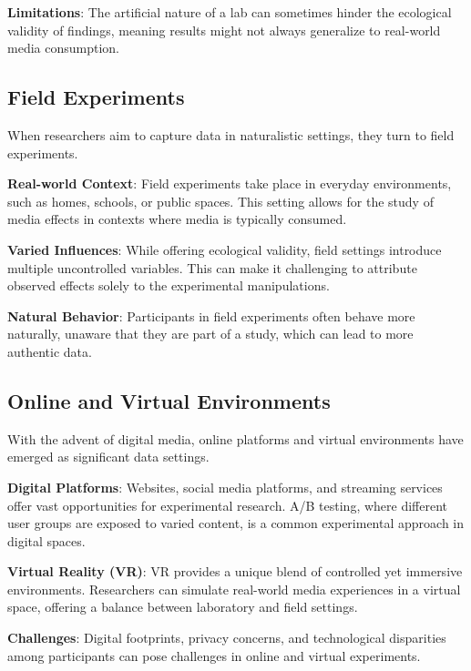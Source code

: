 \documentclass[
  b5paper]{book}
\begin{document}
\textbf{Limitations}: The artificial nature of a lab can sometimes hinder the ecological validity of findings, meaning results might not always generalize to real-world media consumption.

\hypertarget{field-experiments}{%
\subsection*{Field Experiments}\label{field-experiments}}

When researchers aim to capture data in naturalistic settings, they turn to field experiments.

\textbf{Real-world Context}: Field experiments take place in everyday environments, such as homes, schools, or public spaces. This setting allows for the study of media effects in contexts where media is typically consumed.

\textbf{Varied Influences}: While offering ecological validity, field settings introduce multiple uncontrolled variables. This can make it challenging to attribute observed effects solely to the experimental manipulations.

\textbf{Natural Behavior}: Participants in field experiments often behave more naturally, unaware that they are part of a study, which can lead to more authentic data.

\hypertarget{online-and-virtual-environments}{%
\subsection*{Online and Virtual Environments}\label{online-and-virtual-environments}}

With the advent of digital media, online platforms and virtual environments have emerged as significant data settings.

\textbf{Digital Platforms}: Websites, social media platforms, and streaming services offer vast opportunities for experimental research. A/B testing, where different user groups are exposed to varied content, is a common experimental approach in digital spaces.

\textbf{Virtual Reality (VR)}: VR provides a unique blend of controlled yet immersive environments. Researchers can simulate real-world media experiences in a virtual space, offering a balance between laboratory and field settings.

\textbf{Challenges}: Digital footprints, privacy concerns, and technological disparities among participants can pose challenges in online and virtual experiments.
\end{document}
